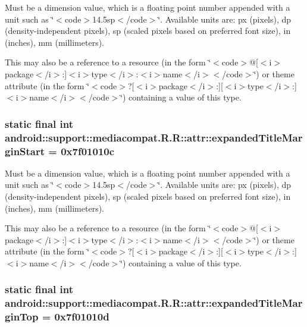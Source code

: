 Must be a dimension value, which is a floating point number appended with a unit such as \char`\"{}$<$code$>$14.5sp$<$/code$>$\char`\"{}. Available units are: px (pixels), dp (density-independent pixels), sp (scaled pixels based on preferred font size), in (inches), mm (millimeters). 

This may also be a reference to a resource (in the form \char`\"{}$<$code$>$@\mbox{[}$<$i$>$package$<$/i$>$:\mbox{]}$<$i$>$type$<$/i$>$:$<$i$>$name$<$/i$>$$<$/code$>$\char`\"{}) or theme attribute (in the form \char`\"{}$<$code$>$?\mbox{[}$<$i$>$package$<$/i$>$:\mbox{]}\mbox{[}$<$i$>$type$<$/i$>$:\mbox{]}$<$i$>$name$<$/i$>$$<$/code$>$\char`\"{}) containing a value of this type. \hypertarget{classandroid_1_1support_1_1mediacompat_1_1_r_1_1attr_e549f021cfdcbfdd443719ed71e73fd8}{
\subsubsection[{expandedTitleMarginStart}]{\setlength{\rightskip}{0pt plus 5cm}static final int android::support::mediacompat.R.R::attr::expandedTitleMarginStart = 0x7f01010c}}
\label{classandroid_1_1support_1_1mediacompat_1_1_r_1_1attr_e549f021cfdcbfdd443719ed71e73fd8}


Must be a dimension value, which is a floating point number appended with a unit such as \char`\"{}$<$code$>$14.5sp$<$/code$>$\char`\"{}. Available units are: px (pixels), dp (density-independent pixels), sp (scaled pixels based on preferred font size), in (inches), mm (millimeters). 

This may also be a reference to a resource (in the form \char`\"{}$<$code$>$@\mbox{[}$<$i$>$package$<$/i$>$:\mbox{]}$<$i$>$type$<$/i$>$:$<$i$>$name$<$/i$>$$<$/code$>$\char`\"{}) or theme attribute (in the form \char`\"{}$<$code$>$?\mbox{[}$<$i$>$package$<$/i$>$:\mbox{]}\mbox{[}$<$i$>$type$<$/i$>$:\mbox{]}$<$i$>$name$<$/i$>$$<$/code$>$\char`\"{}) containing a value of this type. \hypertarget{classandroid_1_1support_1_1mediacompat_1_1_r_1_1attr_1dd96e9ba7ef065f3d11cd6d6c8136f1}{
\subsubsection[{expandedTitleMarginTop}]{\setlength{\rightskip}{0pt plus 5cm}static final int android::support::mediacompat.R.R::attr::expandedTitleMarginTop = 0x7f01010d}}
\label{classandroid_1_1support_1_1mediacompat_1_1_r_1_1attr_1dd96e9ba7ef065f3d11cd6d6c8136f1}


